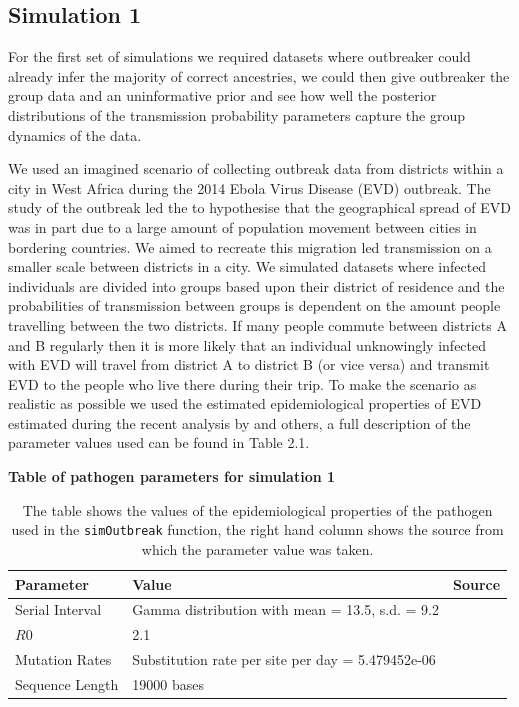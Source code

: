\documentclass[11pt,a4paper]{report}
\begin{document}
\subsection{Simulation 1}
For the first set of simulations we required datasets where outbreaker could already infer the majority of correct ancestries, we could then give outbreaker the group data and an uninformative prior and see how well the posterior distributions of the transmission probability parameters capture the group dynamics of the data.



We used an imagined scenario of collecting outbreak data from districts within a city in West Africa during the 2014 Ebola Virus Disease (EVD) outbreak. The study of the outbreak led the \citet{Ebola14} to hypothesise that the geographical spread of EVD was in part due to a large amount of population movement between cities in bordering countries. We aimed to recreate this migration led transmission on a smaller scale between districts in a city. We simulated datasets where infected individuals are divided into groups based upon their district of residence and the probabilities of transmission between groups is dependent on the amount people travelling between the two districts. If many people commute between districts A and B regularly then it is more likely that an individual unknowingly infected with EVD will travel from district A to district B (or vice versa) and transmit EVD to the people who live there during their trip. To make the scenario as realistic as possible  we used the estimated epidemiological properties of EVD estimated during the recent analysis by \citet{Ebola14} and others, a full description of the parameter values used can be found in Table 2.1.

\begin{table}[h!]
\centering
{\bf Table of pathogen parameters for simulation 1}
\caption{The table shows the values of the epidemiological properties of the pathogen used in the {\tt simOutbreak} function, the right hand column shows the source from which the parameter value was taken.}
\begin{tabular}{| l | p{4cm} | p{4cm} |}
\hline
Parameter & Value & Source \\
\hline
Serial Interval & Gamma distribution with mean = 13.5, s.d. = 9.2 & \citet{Ebola14} \\
\hline
$R0$ & 2.1 & \citet{Ebola14} \\
\hline
Mutation Rates & Substitution rate per site per day =  5.479452e-06 & \citet{Gire14} \\
\hline
Sequence Length & 19000 bases & \citet{Volchkov99} \\
\hline
\end{tabular}
\end{table}
\end{document}
